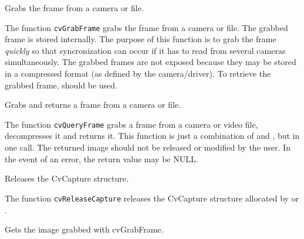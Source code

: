 Grabs the frame from a camera or file.


\begin{description}
\end{description}

The function \texttt{cvGrabFrame} grabs the frame from a camera or file. The grabbed frame is stored internally. The purpose of this function is to grab the frame \emph{quickly} so that syncronization can occur if it has to read from several cameras simultaneously. The grabbed frames are not exposed because they may be stored in a compressed format (as defined by the camera/driver). To retrieve the grabbed frame,  should be used.


Grabs and returns a frame from a camera or file.


\begin{description}
\end{description}

The function \texttt{cvQueryFrame} grabs a frame from a camera or video file, decompresses it and returns it. This function is just a combination of  and , but in one call. The returned image should not be released or modified by the user.  In the event of an error, the return value may be NULL.

\ifC
{} 
Releases the CvCapture structure.


\begin{description}
\end{description}

The function \texttt{cvReleaseCapture} releases the CvCapture structure allocated by  or .
\fi

Gets the image grabbed with cvGrabFrame.


